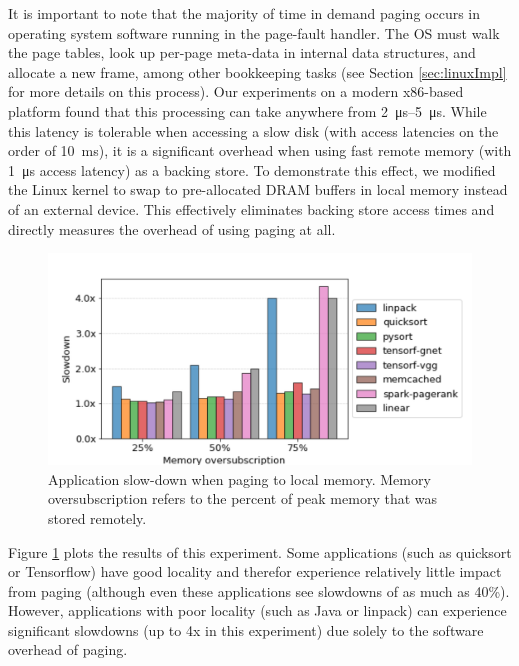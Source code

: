 It is important to note that the majority of time in demand paging occurs in
operating system software running in the page-fault handler. The OS must walk
the page tables, look up per-page meta-data in internal data structures, and
allocate a new frame, among other \gls{bookkeeping} tasks (see Section
\ref{sec:linuxImpl} for more details on this process). Our experiments on a
modern x86-based platform found that this processing can take anywhere from
\SIrange{2}{5}{\micro\second}. While this latency is tolerable when accessing a
slow disk (with access latencies on the order of \SI{10}{\milli\second}), it is
a significant overhead when using fast remote memory (with
\SI{1}{\micro\second} access latency) as a backing store. To demonstrate this
effect, we modified the Linux kernel to swap to pre-allocated DRAM buffers in
local memory instead of an external device.  This effectively eliminates
backing store access times and directly measures the overhead of using paging
at all.

\begin{figure}[h]
    \centering
    \includegraphics[width=0.9\columnwidth]{figs/paging_overhead.png}
    \vspace{-5mm}
    \caption{Application slow-down when paging to local memory. Memory
oversubscription refers to the percent of peak memory that was stored remotely.}
    \label{fig:paging_overhead}
\end{figure}

Figure \ref{fig:paging_overhead} plots the results of this experiment. Some
applications (such as quicksort or Tensorflow) have good locality and therefor
experience relatively little impact from paging (although even these
applications see slowdowns of as much as 40\%). However, applications with
poor locality (such as Java or linpack) can experience significant slowdowns
(up to 4x in this experiment) due solely to the software overhead of paging. 

